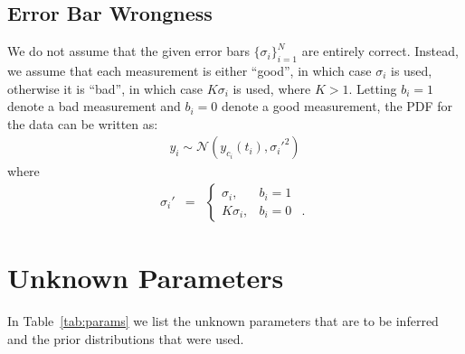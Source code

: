 \documentclass[a4paper, 10pt]{article}
\begin{document}
\subsection{Error Bar Wrongness}
We do not assume that the given error bars
$\{\sigma_i\}_{i=1}^N$ are entirely correct. Instead, we assume that each
measurement is either ``good'', in which case $\sigma_i$ is used, otherwise it
is ``bad'', in which case $K\sigma_i$ is used, where $K > 1$. Letting $b_i = 1$
denote a bad measurement and $b_i=0$ denote a good measurement, the PDF for the
data can be written as:
\begin{eqnarray}
y_i \sim \mathcal{N}
\left(
y_{c_i}(t_i), \sigma_i'^2
\right)\label{eq:noise}
\end{eqnarray}
where
\begin{eqnarray}
\sigma_i' &=& \left\{
\begin{array}{lrl}
\sigma_i, & b_i = 1\\
K\sigma_i, & b_i = 0 & .
\end{array}
\right.
\end{eqnarray}

\section{Unknown Parameters}
In Table~\ref{tab:params} we list the unknown parameters that are to be inferred
and the prior distributions that were used.
\end{document}
